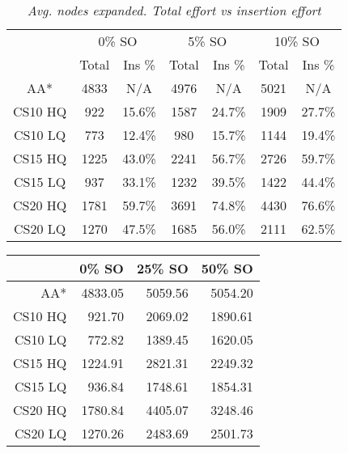 \begin{table}[ht]
\caption{\small{\emph{Avg. nodes expanded. Total effort vs insertion effort}}}
\label{aha-table:searcheffort}
\begin{center}
\begin{tabular*}{0.48\textwidth}{@{\extracolsep{\fill}}ccccccc}%
  \hline
 & \multicolumn{2}{c}{\small{0\% SO}} & \multicolumn{2}{c}{\small{5\% SO}} & \multicolumn{2}{c}{\small{10\% SO}} \\
 & \small{Total} & \small{Ins \%} & \small{Total} & \small{Ins \%} & \small{Total} & \small{Ins \%} \\
  \hline
\small{AA*} & \small{4833 }& \small{N/A }& \small{4976 }& \small{N/A }& \small{5021} & \small{N/A }\\
\small{CS10 HQ }& \small{922 }& \small{15.6\%} & \small{1587} & \small{24.7\% }& \small{1909 }& \small{27.7\% }\\
\small{CS10 LQ }& \small{773 }& \small{12.4\% }& \small{980 }& \small{15.7\% }& \small{1144 }& \small{19.4\% }\\
\small{CS15 HQ }& \small{1225 }& \small{43.0\%} & \small{2241 }& \small{56.7\% }& \small{2726 }& \small{59.7\%} \\
\small{CS15 LQ }& \small{937 }& \small{33.1\% }& \small{1232 }& \small{39.5\% }& \small{1422} & \small{44.4\% }\\
\small{CS20 HQ }& \small{1781} & \small{59.7\% }& \small{3691 }& \small{74.8\% }& \small{4430 }& \small{76.6\% }\\
\small{CS20 LQ }& \small{1270} & \small{47.5\% }& \small{1685 }& \small{56.0\% }& \small{2111 }& \small{62.5\% }\\
   \hline
\end{tabular*}
\end{center}
\end{table}
\begin{table}[ht]
\begin{center}
\begin{tabular}{rrrr}
  \hline
 & 0\% SO & 25\% SO & 50\% SO \\
  \hline
AA* & 4833.05 & 5059.56 & 5054.20 \\
  CS10 HQ & 921.70 & 2069.02 & 1890.61 \\
  CS10 LQ & 772.82 & 1389.45 & 1620.05 \\
  CS15 HQ & 1224.91 & 2821.31 & 2249.32 \\
  CS15 LQ & 936.84 & 1748.61 & 1854.31 \\
  CS20 HQ & 1780.84 & 4405.07 & 3248.46 \\
  CS20 LQ & 1270.26 & 2483.69 & 2501.73 \\
   \hline
\end{tabular}
\end{center}
\end{table}
